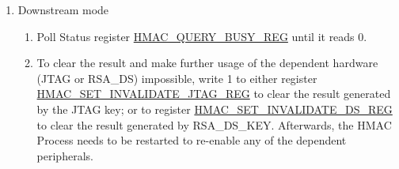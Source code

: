 \documentclass[main\_\_EN.tex]{subfiles}
\begin{document}
\begin{enumerate}
    \item Downstream mode
    \begin{enumerate}
        \item Poll Status register \hyperref[regdesc:HMACQUERYBUSYREG]{HMAC\_QUERY\_BUSY\_REG} until it reads 0.
        \item
        To clear the result and make further usage of the dependent hardware (JTAG or RSA\_DS) impossible, write 1 to either register \hyperref[regdesc:HMACSETINVALIDATEJTAGREG]{HMAC\_SET\_INVALIDATE\_JTAG\_REG} to clear the result generated by the JTAG key; or to register \hyperref[regdesc:HMACSETINVALIDATEDSREG]{HMAC\_SET\_INVALIDATE\_DS\_REG} to clear the result generated by RSA\_DS\_KEY. Afterwards, the HMAC Process needs to be restarted to re-enable any of the dependent peripherals.
    \end{enumerate}


\end{enumerate}
\end{document}
